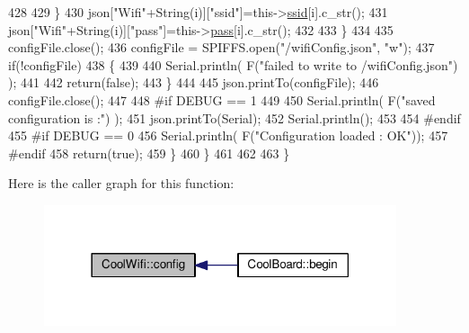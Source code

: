 \begin{DoxyCode}
428                     
429                 \}
430                 json[\textcolor{stringliteral}{"Wifi"}+String(i)][\textcolor{stringliteral}{"ssid"}]=this->\hyperlink{class_cool_wifi_a893b21d0fed821438733bba2e73fb4c2}{ssid}[i].c\_str();
431                 json[\textcolor{stringliteral}{"Wifi"}+String(i)][\textcolor{stringliteral}{"pass"}]=this->\hyperlink{class_cool_wifi_a0c3332a149245aaad060b32593a54c9b}{pass}[i].c\_str();           
432                         
433             \}
434 
435             configFile.close();
436             configFile = SPIFFS.open(\textcolor{stringliteral}{"/wifiConfig.json"}, \textcolor{stringliteral}{"w"});
437             \textcolor{keywordflow}{if}(!configFile)
438             \{
439             
440                 Serial.println( F(\textcolor{stringliteral}{"failed to write to /wifiConfig.json"}) );
441             
442                 \textcolor{keywordflow}{return}(\textcolor{keyword}{false});              
443             \}
444             
445             json.printTo(configFile);
446             configFile.close();
447 
448 \textcolor{preprocessor}{        #if DEBUG == 1 }
449 
450             Serial.println( F(\textcolor{stringliteral}{"saved configuration is :"}) );
451             json.printTo(Serial);
452             Serial.println();
453         
454 \textcolor{preprocessor}{        #endif}
455 \textcolor{preprocessor}{        #if DEBUG == 0}
456             Serial.println( F(\textcolor{stringliteral}{"Configuration loaded : OK"}));
457 \textcolor{preprocessor}{        #endif}
458             \textcolor{keywordflow}{return}(\textcolor{keyword}{true}); 
459         \}
460     \}   
461     
462 
463 \}
\end{DoxyCode}
Here is the caller graph for this function\+:\nopagebreak
\begin{figure}[H]
\begin{center}
\leavevmode
\includegraphics[width=294pt]{d7/d29/class_cool_wifi_a4eb2f6b9b09dd588964b88b6c70122c0_icgraph}
\end{center}
\end{figure}
\mbox{\label{class_cool_wifi_a2a9a546f76816c8c5c8e2d46a6c4f07d}} 
